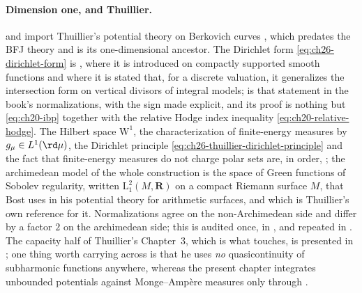 \paragraph{Dimension one, and Thuillier.}
 and  import
Thuillier's potential theory on Berkovich curves \cite{Thu05}, which
predates the BFJ theory and is its one-dimensional ancestor.  The Dirichlet
form \eqref{eq:ch26-dirichlet-form} is \cite[\S3.5]{Thu05}, where it is
introduced on compactly supported smooth functions and where it is stated
that, for a discrete valuation, it generalizes the intersection form on
vertical divisors of integral models;
 is that statement in the book's
normalizations, with the sign made explicit, and its proof is nothing but
\eqref{eq:ch20-ibp} together with the relative Hodge index inequality
\eqref{eq:ch20-relative-hodge}.  The Hilbert space \(\mathrm W^1\), the
characterization of finite-energy measures by
\(g_\mu\in L^1(\rd\mu)\), the Dirichlet principle
\eqref{eq:ch26-thuillier-dirichlet-principle} and the fact that
finite-energy measures do not charge polar sets are, in order,
\cite[Propositions~3.5.2, 3.5.7, 3.5.9, 3.5.10 and
Th\'eor\`eme~3.5.11]{Thu05}; the archimedean model of the whole construction
is the space of Green functions of Sobolev regularity, written
\(\mathrm L^2_1(M,\mathbf R)\) on a compact Riemann surface \(M\), that
Bost uses in his potential theory for arithmetic surfaces, and which is
Thuillier's own reference for it.
Normalizations agree on the non-Archimedean side and differ by a factor
\(2\) on the archimedean side; this is audited once, in
, and repeated in
.  The capacity half of Thuillier's
Chapter~3, which is what  touches, is presented in
; one thing worth carrying across is that he uses
\emph{no} quasicontinuity of subharmonic functions anywhere, whereas the
present chapter integrates unbounded potentials against Monge--Amp\`ere
measures only through .

